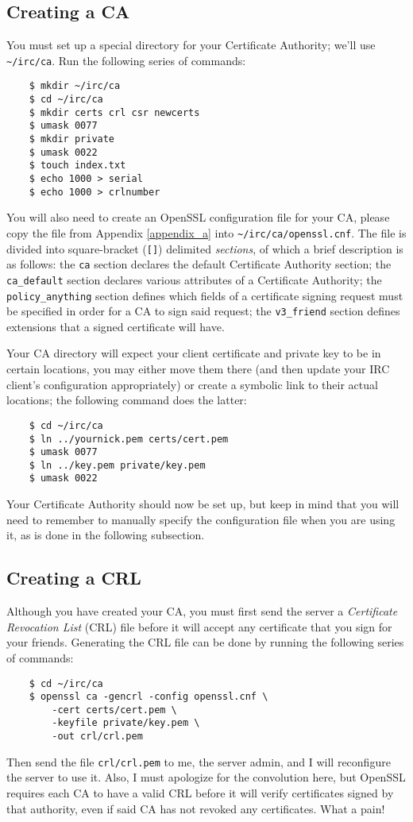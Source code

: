 \documentclass{article}
\begin{document}
{\subsection{Creating a CA}
You must set up a special directory for your Certificate Authority; we'll use \texttt{\textasciitilde /irc/ca}.  Run the following series of commands:
\begin{lstlisting}
    $ mkdir ~/irc/ca
    $ cd ~/irc/ca
    $ mkdir certs crl csr newcerts
    $ umask 0077
    $ mkdir private
    $ umask 0022
    $ touch index.txt
    $ echo 1000 > serial
    $ echo 1000 > crlnumber
\end{lstlisting}
You will also need to create an OpenSSL configuration file for your CA, please copy the file from Appendix \ref{appendix_a} into \texttt{\textasciitilde /irc/ca/openssl.cnf}.  The file is divided into square-bracket (\texttt{[]}) delimited \textit{sections}, of which a brief description is as follows: the \texttt{ca} section declares the default Certificate Authority section; the \texttt{ca\_default} section declares various attributes of a Certificate Authority; the \texttt{policy\_anything} section defines which fields of a certificate signing request must be specified in order for a CA to sign said request;  the \texttt{v3\_friend} section defines extensions that a signed certificate will have.

Your CA directory will expect your client certificate and private key to be in certain locations, you may either move them there (and then update your IRC client's configuration appropriately) or create a symbolic link to their actual locations; the following command does the latter:
\begin{lstlisting}
    $ cd ~/irc/ca
    $ ln ../yournick.pem certs/cert.pem
    $ umask 0077
    $ ln ../key.pem private/key.pem
    $ umask 0022
\end{lstlisting}
Your Certificate Authority should now be set up, but keep in mind that you will need to remember to manually specify the configuration file when you are using it, as is done in the following subsection.

\subsection{Creating a CRL}
\label{crlsubsec}
Although you have created your CA, you must first send the server a \textit{Certificate Revocation List} (CRL) file before it will accept any certificate that you sign for your friends.  Generating the CRL file can be done by running the following series of commands:
\begin{lstlisting}
	$ cd ~/irc/ca
	$ openssl ca -gencrl -config openssl.cnf \
		-cert certs/cert.pem \
		-keyfile private/key.pem \
		-out crl/crl.pem
\end{lstlisting}
Then send the file \texttt{crl/crl.pem} to me, the server admin, and I will reconfigure the server to use it.  Also, I must apologize for the convolution here, but OpenSSL requires each CA to have a valid CRL before it will verify certificates signed by that authority, even if said CA has not revoked any certificates.  What a pain!

}
\end{document}
